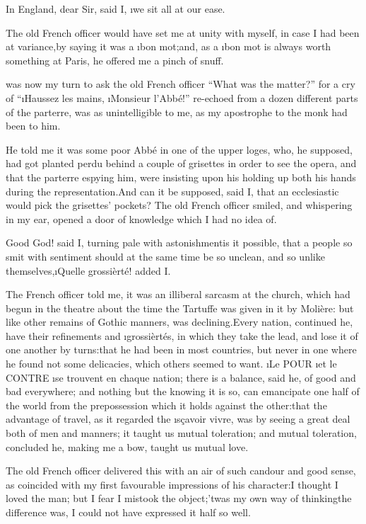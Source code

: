 \documentclass[twoside]{article}
\begin{document}
\tsk In England, dear Sir, said I, \i{we sit all at our ease}.

The old French officer would have set me at unity with myself, in case I
had been at variance,\tsk by saying it was a \i{bon mot};\tsk and, as a \i{bon mot}
is always worth something at Paris, he offered me a pinch of snuff.






 was now my turn to ask the old French officer “What was the matter?”
for a cry of “\i{Haussez les mains}, \i{Monsieur l’Abbé}!” re-echoed from a
dozen different parts of the parterre, was as unintelligible to me, as my
apostrophe to the monk had been to him.

He told me it was some poor Abbé in one of the upper loges, who, he
supposed, had got planted perdu behind a couple of grisettes in order to
see the opera, and that the parterre espying him, were insisting upon his
holding up both his hands during the representation.\tsk And can it be
supposed, said I, that an ecclesiastic would pick the grisettes’ pockets?
The old French officer smiled, and whispering in my ear, opened a door of
knowledge which I had no idea of.

Good God! said I, turning pale with astonishment\tsk is it possible, that a
people so smit with sentiment should at the same time be so unclean, and
so unlike themselves,\tsk \i{Quelle grossièrté}! added I.

The French officer told me, it was an illiberal sarcasm at the church,
which had begun in the theatre about the time the Tartuffe was given in
it by Molière: but like other remains of Gothic manners, was
declining.\tsk Every nation, continued he, have their refinements and
\i{grossièrtés}, in which they take the lead, and lose it of one another by
turns:\tsk that he had been in most countries, but never in one where he
found not some delicacies, which others seemed to want.  \i{Le} POUR \i{et
le} CONTRE \i{se trouvent en chaque nation}; there is a balance, said he,
of good and bad everywhere; and nothing but the knowing it is so, can
emancipate one half of the world from the prepossession which it holds
against the other:\tsk that the advantage of travel, as it regarded the
\i{sçavoir vivre}, was by seeing a great deal both of men and manners; it
taught us mutual toleration; and mutual toleration, concluded he, making
me a bow, taught us mutual love.

The old French officer delivered this with an air of such candour and
good sense, as coincided with my first favourable impressions of his
character:\tsk I thought I loved the man; but I fear I mistook the
object;\tsk ’twas my own way of thinking\tsk the difference was, I could not have
expressed it half so well.
\end{document}
